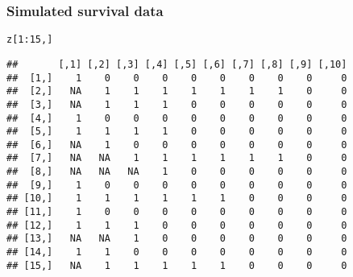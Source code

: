 \documentclass[color=usenames,dvipsnames]{beamer}\usepackage[]{graphicx}\usepackage[]{color}
\makeatletter
\newcommand{\hlnum}[1]{\textcolor[rgb]{0.69,0.494,0}{#1}}%
\newcommand{\hlopt}[1]{\textcolor[rgb]{0,0,0}{#1}}%
\newcommand{\hlstd}[1]{\textcolor[rgb]{0,0,0}{#1}}%
\newenvironment{kframe}{%
 \def\at@end@of@kframe{}%
 \ifinner\ifhmode%
  \def\at@end@of@kframe{\end{minipage}}%
  \begin{minipage}{\columnwidth}%
 \fi\fi%
 \def\FrameCommand##1{\hskip\@totalleftmargin \hskip-\fboxsep
 \colorbox{shadecolor}{##1}\hskip-\fboxsep
     \hskip-\linewidth \hskip-\@totalleftmargin \hskip\columnwidth}%
 \MakeFramed {\advance\hsize-\width
   \@totalleftmargin\z@ \linewidth\hsize
   \@setminipage}}%
 {\par\unskip\endMakeFramed%
 \at@end@of@kframe}
\newenvironment{knitrout}{}{} %
\makeatother
\begin{document}
\begin{frame}[fragile]
  \frametitle{Simulated survival data}
\begin{knitrout}\small
{}\color{fgcolor}\begin{kframe}
\begin{alltt}
\hlstd{z[}\hlnum{1}\hlopt{:}\hlnum{15}\hlstd{,]}
\end{alltt}
\begin{verbatim}
##       [,1] [,2] [,3] [,4] [,5] [,6] [,7] [,8] [,9] [,10]
##  [1,]    1    0    0    0    0    0    0    0    0     0
##  [2,]   NA    1    1    1    1    1    1    1    0     0
##  [3,]   NA    1    1    1    0    0    0    0    0     0
##  [4,]    1    0    0    0    0    0    0    0    0     0
##  [5,]    1    1    1    1    0    0    0    0    0     0
##  [6,]   NA    1    0    0    0    0    0    0    0     0
##  [7,]   NA   NA    1    1    1    1    1    1    0     0
##  [8,]   NA   NA   NA    1    0    0    0    0    0     0
##  [9,]    1    0    0    0    0    0    0    0    0     0
## [10,]    1    1    1    1    1    1    0    0    0     0
## [11,]    1    0    0    0    0    0    0    0    0     0
## [12,]    1    1    1    0    0    0    0    0    0     0
## [13,]   NA   NA    1    0    0    0    0    0    0     0
## [14,]    1    1    0    0    0    0    0    0    0     0
## [15,]   NA    1    1    1    1    1    0    0    0     0
\end{verbatim}
\end{kframe}
\end{knitrout}
\end{frame}







\end{document}
